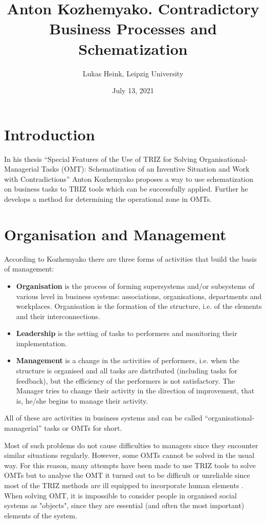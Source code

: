 \documentclass[a4paper,11pt]{article}
\title{Anton Kozhemyako. Contradictory Business Processes and Schematization}
\author{Lukas Heink, Leipzig University}
\date{July 13, 2021}
\begin{document}
\maketitle

\section{Introduction}

In his thesis “Special Features of the Use of TRIZ for Solving
Organisational-Managerial Tasks (OMT): Schematization of an Inventive
Situation and Work with Contradictions” \cite{K1} Anton Kozhemyako proposes a
way to use schematization on business tasks to TRIZ tools which can be
successfully applied. Further he develops a method for determining the
operational zone in OMTs.

\section{Organisation and Management}

According to Kozhemyako \cite{K1} there are three forms of activities that
build the basis of management: 
\begin{itemize}
\item \textbf{Organisation} is the process of forming supersystems and/or
  subsystems of various level in business systems: associations,
  organisations, departments and workplaces. Organisation is the formation of
  the structure, i.e. of the elements and their interconnections.
\item \textbf{Leadership} is the setting of tasks to performers and monitoring
  their implementation.
\item \textbf{Management} is a change in the activities of performers, i.e.
  when the structure is organised and all tasks are distributed (including
  tasks for feedback), but the efficiency of the performers is not
  satisfactory.  The Manager tries to change their activity in the direction
  of improvement, that is, he/she begins to manage their activity.
\end{itemize}
All of these are activities in business systems and can be called
“organisational-managerial” tasks or OMTs for short.

Most of such problems do not cause difficulties to managers since they
encounter similar situations regularly. However, some OMTs cannot be solved in
the usual way.  For this reason, many attempts have been made to use TRIZ
tools to solve OMTs but to analyse the OMT it turned out to be difficult or
unreliable since most of the TRIZ methods are ill equipped to incorporate
human elements \cite{K1}. When solving OMT, it is impossible to consider
people in organised social systems as "objects", since they are essential (and
often the most important) elements of the system.
\end{document}
